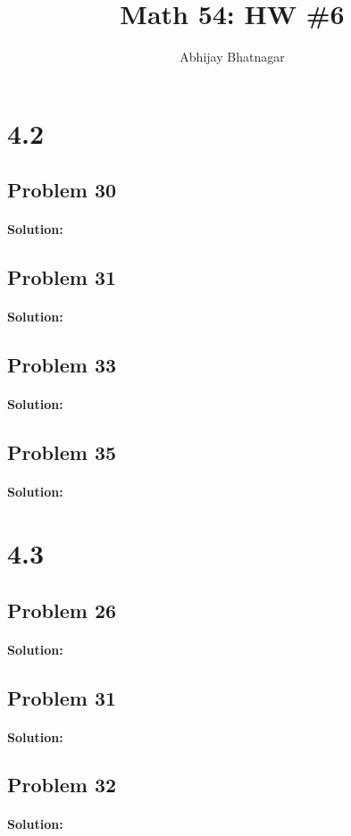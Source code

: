 \documentclass[11pt, notitlepage]{report}
\makeatletter
\newenvironment{solution}{\paragraph{Solution:}}{\hfill}
\newcommand*{\toccontents}{\@starttoc{toc}}
\makeatother
\begin{document}
   \title{Math 54: HW \#6}
   \author{Abhijay Bhatnagar}
   \maketitle
   \toccontents


\setcounter{secnumdepth}{0} %
\section{4.2}
\subsection{Problem 30}
\begin{solution}
\end{solution}
\subsection{Problem 31}
\begin{solution}
\end{solution}
\subsection{Problem 33}
\begin{solution}
\end{solution}
\subsection{Problem 35}
\begin{solution}
\end{solution}
\section{4.3}
\subsection{Problem 26}
\begin{solution}
\end{solution}
\subsection{Problem 31}
\begin{solution}
\end{solution}
\subsection{Problem 32}
\begin{solution}
\end{solution}
\end{document}
